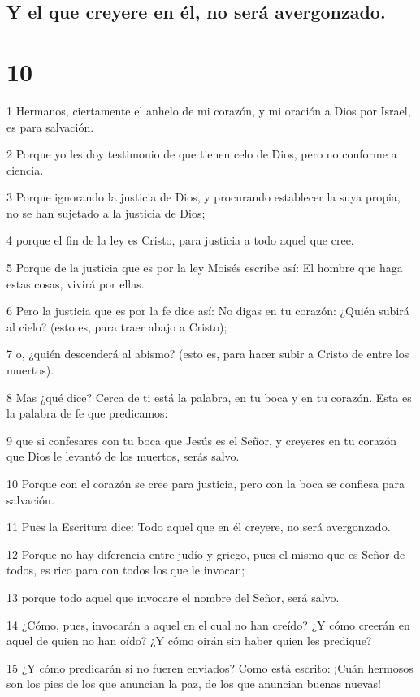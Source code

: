 \section*{Y el que creyere en él, no será avergonzado.}

\chapter{10}

\par 1 Hermanos, ciertamente el anhelo de mi corazón, y mi oración a Dios por Israel, es para salvación.
\par 2 Porque yo les doy testimonio de que tienen celo de Dios, pero no conforme a ciencia.
\par 3 Porque ignorando la justicia de Dios, y procurando establecer la suya propia, no se han sujetado a la justicia de Dios;
\par 4 porque el fin de la ley es Cristo, para justicia a todo aquel que cree.
\par 5 Porque de la justicia que es por la ley Moisés escribe así: El hombre que haga estas cosas, vivirá por ellas.
\par 6 Pero la justicia que es por la fe dice así: No digas en tu corazón: ¿Quién subirá al cielo? (esto es, para traer abajo a Cristo);
\par 7 o, ¿quién descenderá al abismo? (esto es, para hacer subir a Cristo de entre los muertos).
\par 8 Mas ¿qué dice? Cerca de ti está la palabra, en tu boca y en tu corazón. Esta es la palabra de fe que predicamos:
\par 9 que si confesares con tu boca que Jesús es el Señor, y creyeres en tu corazón que Dios le levantó de los muertos, serás salvo.
\par 10 Porque con el corazón se cree para justicia, pero con la boca se confiesa para salvación.
\par 11 Pues la Escritura dice: Todo aquel que en él creyere, no será avergonzado.
\par 12 Porque no hay diferencia entre judío y griego, pues el mismo que es Señor de todos, es rico para con todos los que le invocan;
\par 13 porque todo aquel que invocare el nombre del Señor, será salvo.
\par 14 ¿Cómo, pues, invocarán a aquel en el cual no han creído? ¿Y cómo creerán en aquel de quien no han oído? ¿Y cómo oirán sin haber quien les predique?
\par 15 ¿Y cómo predicarán si no fueren enviados? Como está escrito: ¡Cuán hermosos son los pies de los que anuncian la paz, de los que anuncian buenas nuevas!
